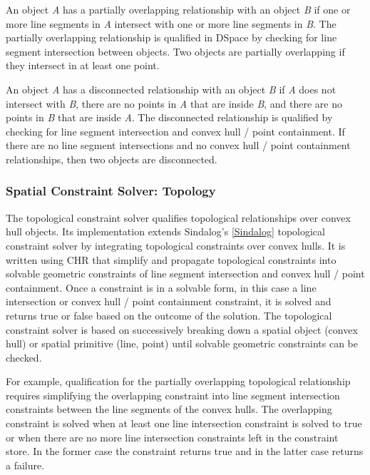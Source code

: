 \documentclass[12pt]{ucthesis}
\begin{document}
An object \emph{A} has a partially overlapping relationship with an object \emph{B} if one or more line segments in \emph{A} intersect with one or more line segments in \emph{B}. The partially overlapping relationship is qualified in DSpace by checking for line segment intersection between objects. Two objects are partially overlapping if they intersect in at least one point.  

An object \emph{A} has a disconnected relationship with an object \emph{B} if \emph{A} does not intersect with \emph{B}, there are no points in \emph{A} that are inside \emph{B}, and there are no points in \emph{B} that are inside \emph{A}. The disconnected relationship is qualified by checking for line segment intersection and convex hull / point containment. If there are no line segment intersections and no convex hull / point containment relationships, then two objects are disconnected.  

\subsubsection{Spatial Constraint Solver: Topology}
The topological constraint solver qualifies topological relationships over convex hull objects. Its implementation extends Sindalog's \ref{Sindalog} topological constraint solver by integrating topological constraints over convex hulls. It is written using CHR that simplify and propagate topological constraints into solvable geometric constraints of line segment intersection and convex hull / point containment. Once a constraint is in a solvable form, in this case a line intersection or convex hull / point containment constraint, it is solved and returns true or false based on the outcome of the solution. The topological constraint solver is based on successively breaking down a spatial object (convex hull) or spatial primitive (line, point) until solvable geometric constraints can be checked.

For example, qualification for the partially overlapping topological relationship requires simplifying the overlapping constraint into line segment intersection constraints between the line segments of the convex hulls. The overlapping constraint is solved when at least one line intersection constraint is solved to true or when there are no more line intersection constraints left in the constraint store. In the former case the constraint returns true and in the latter case returns a failure. 
\end{document}
